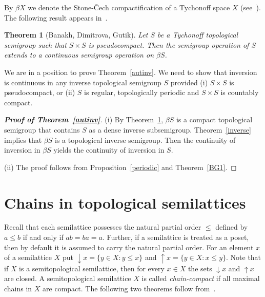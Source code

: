 \documentclass[12pt, twoside, leqno]{article}
\newtheorem{theorem}{Theorem}[section]
\theoremstyle{definition}
\numberwithin{equation}{section}
\begin{document}
By $\beta X$ we denote the Stone-\v{C}ech compactification of a Tychonoff space $X$ (see~\cite[Chapter~3.6]{Eng}). %
The following result appears in~\cite[Theorem 2.3]{BDG}.



\begin{theorem}[Banakh, Dimitrova, Gutik]\label{BDG}
Let $S$ be a Tychonoff topological semigroup  such that $S{\times}S$ is pseudocompact. Then the semigroup operation of $S$ extends to a continuous semigroup operation on $\beta S$.    
\end{theorem}




We are in a position to prove Theorem~\ref{autinv}. We need to show that inversion is continuous in any inverse topological semigroup $S$ provided (i) $S{\times}S$ is pseudocompact, or (ii) $S$ is regular, topologically periodic and $S{\times}S$ is countably compact.


\begin{proof}[{\bf Proof of Theorem~\ref{autinv}}]
(i)    By Theorem~\ref{BDG}, $\beta S$ is a compact topological semigroup that contains $S$ as a dense inverse subsemigroup. Theorem~\ref{inverse} implies that $\beta S$ is a topological inverse semigroup. Then the continuity of inversion in $\beta S$ yields the continuity of inversion in $S$.  

(ii) The proof follows from Proposition~\ref{periodic} and Theorem~\ref{BG1}.    
\end{proof}


\section{Chains in topological semilattices}\label{secchain}
Recall that each semilattice possesses the natural partial order $\leq$ defined by $a\leq b$ if and only if $ab=ba=a$. Further, if a semilattice is treated as a poset, then by default it is assumed to carry the natural partial order.
For an element $x$ of a semilattice $X$ put ${\downarrow}x=\{y\in X\colon y\leq x\}$ and ${\uparrow}x=\{y\in X\colon x\leq y\}$. Note that if $X$ is a semitopological semilattice, then for every $x\in X$ the sets ${\downarrow}x$ and ${\uparrow}x$ are closed.
A semitopological semilattice $X$ is called {\em chain-compact} if all maximal chains in $X$ are compact. The following two theorems follow from~\cite[Theorem 3.1]{BB}. 
\end{document}
